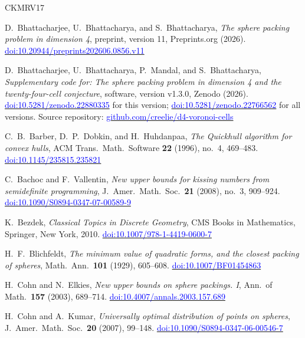 \documentclass[11pt,reqno]{amsart}
\newcommand{\bluelink}[2]{\href{#1}{\textcolor{blue}{#2}}}
\renewcommand{\_}{\origunderscore\allowbreak}
\numberwithin{equation}{section}
\theoremstyle{plain}
\theoremstyle{definition}
\theoremstyle{remark}
\begin{document}
\begin{thebibliography}{CKMRV17}
\setlength{\itemsep}{-1.3pt}

D.~Bhattacharjee, U.~Bhattacharya, and S.~Bhattacharya,
\textit{The sphere packing problem in dimension 4},
preprint, version 11, Preprints.org (2026).
\bluelink{https://doi.org/10.20944/preprints202606.0856.v11}{doi:10.20944/preprints202606.0856.v11}

D.~Bhattacharjee, U.~Bhattacharya, P.~Mandal, and S.~Bhattacharya,
\textit{Supplementary code for: The sphere packing problem in dimension 4 and the twenty-four-cell conjecture},
software, version v1.3.0, Zenodo (2026).
\bluelink{https://doi.org/10.5281/zenodo.22880335}{doi:10.5281/zenodo.22880335}
for this version;
\bluelink{https://doi.org/10.5281/zenodo.22766562}{doi:10.5281/zenodo.22766562}
for all versions.
Source repository:
\bluelink{https://github.com/creelie/d4-voronoi-cells}{github.com/creelie/d4-voronoi-cells}

C.~B.~Barber, D.~P.~Dobkin, and H.~Huhdanpaa,
\textit{The Quickhull algorithm for convex hulls},
ACM Trans.\ Math.\ Software \textbf{22} (1996), no.~4, 469--483.
\bluelink{https://doi.org/10.1145/235815.235821}{doi:10.1145/235815.235821}

C.~Bachoc and F.~Vallentin,
\textit{New upper bounds for kissing numbers from semidefinite programming},
J.\ Amer.\ Math.\ Soc.\ \textbf{21} (2008), no.~3, 909--924.
\bluelink{https://doi.org/10.1090/S0894-0347-07-00589-9}{doi:10.1090/S0894-0347-07-00589-9}

K.~Bezdek,
\textit{Classical Topics in Discrete Geometry},
CMS Books in Mathematics, Springer, New York, 2010.
\bluelink{https://doi.org/10.1007/978-1-4419-0600-7}{doi:10.1007/978-1-4419-0600-7}

H.~F.~Blichfeldt,
\textit{The minimum value of quadratic forms, and the closest packing of spheres},
Math.\ Ann.\ \textbf{101} (1929), 605--608.
\bluelink{https://doi.org/10.1007/BF01454863}{doi:10.1007/BF01454863}

H.~Cohn and N.~Elkies,
\textit{New upper bounds on sphere packings. {I}},
Ann.\ of Math.\ \textbf{157} (2003), 689--714.
\bluelink{https://doi.org/10.4007/annals.2003.157.689}{doi:10.4007/annals.2003.157.689}

H.~Cohn and A.~Kumar,
\textit{Universally optimal distribution of points on spheres},
J.\ Amer.\ Math.\ Soc.\ \textbf{20} (2007), 99--148.
\bluelink{https://doi.org/10.1090/S0894-0347-06-00546-7}{doi:10.1090/S0894-0347-06-00546-7}


\end{thebibliography}
\end{document}
